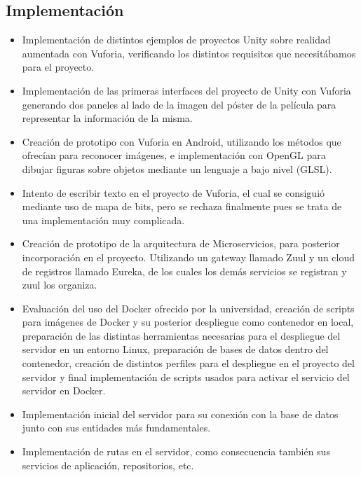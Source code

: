     \subsection{Implementación}
    \label{makereference7.4.3}
        \begin{itemize}
            \item Implementación de distintos ejemplos de proyectos Unity sobre realidad aumentada
            con Vuforia, verificando los distintos requisitos
            que necesitábamos para el proyecto. 
            \item Implementación de las primeras interfaces del proyecto de Unity con Vuforia generando dos 
            paneles al lado de la imagen del póster de la película para representar la información de la misma.
            \item Creación de prototipo con Vuforia en Android, utilizando los métodos que ofrecían para reconocer imágenes,
            e implementación con OpenGL para dibujar figuras sobre objetos mediante un lenguaje a bajo nivel (GLSL).
            \item Intento de escribir texto en el proyecto de Vuforia, el cual se consiguió mediante uso de mapa de bits, pero se rechaza 
            finalmente pues se trata de una implementación muy complicada.
            \item Creación de prototipo de la arquitectura de Microservicios, para posterior 
            incorporación en el proyecto. Utilizando un gateway llamado Zuul y un cloud de registros llamado Eureka, de los cuales 
            los demás servicios se registran y zuul los organiza.
            \item Evaluación del uso del Docker ofrecido por la universidad, creación de 
            scripts para imágenes de Docker y su posterior despliegue como contenedor en local, preparación de las distintas herramientas 
            necesarias para el despliegue del servidor en un entorno Linux, preparación de bases de datos dentro del contenedor, creación 
            de distintos perfiles para el despliegue en el proyecto del servidor y final implementación de scripts usados para activar el servicio 
            del servidor en Docker.
            \item Implementación inicial del servidor para su conexión con la base de datos junto con sus entidades más fundamentales.
            \item Implementación de rutas en el servidor, como consecuencia también sus servicios de aplicación, repositorios, etc.

\end{itemize}
